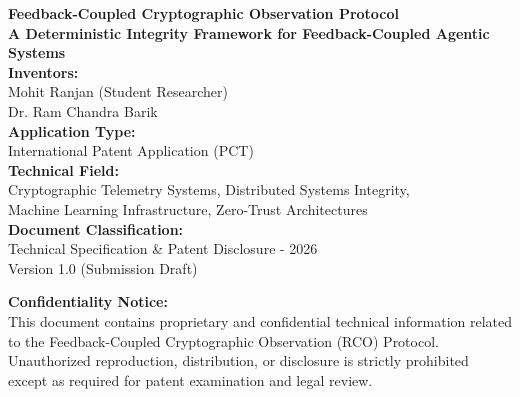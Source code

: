 \begin{titlepage}

\begin{center}


\vspace*{1cm}

{\Huge \textbf{Feedback-Coupled Cryptographic Observation Protocol}}\\[0.5cm]

{\large \textbf{A Deterministic Integrity Framework for Feedback-Coupled Agentic Systems}}\\[1cm]


\textbf{Inventors:}\\[0.5cm]

Mohit Ranjan (Student Researcher)\\
Dr. Ram Chandra Barik\\[1cm]


\textbf{Application Type:}\\[0.3cm]
International Patent Application (PCT)\\[1cm]


\textbf{Technical Field:}\\[0.3cm]

Cryptographic Telemetry Systems, Distributed Systems Integrity,\\
Machine Learning Infrastructure, Zero-Trust Architectures\\[1cm]


\textbf{Document Classification:}\\[0.3cm]

Technical Specification \& Patent Disclosure - 2026\\
Version 1.0 (Submission Draft)\\[1cm]


\begin{minipage}{0.85\textwidth}
\small
\textbf{Confidentiality Notice:} \\
This document contains proprietary and confidential technical information related to the Feedback-Coupled Cryptographic Observation (RCO) Protocol. Unauthorized reproduction, distribution, or disclosure is strictly prohibited except as required for patent examination and legal review.
\end{minipage}

\vfill

\end{center}

\end{titlepage}